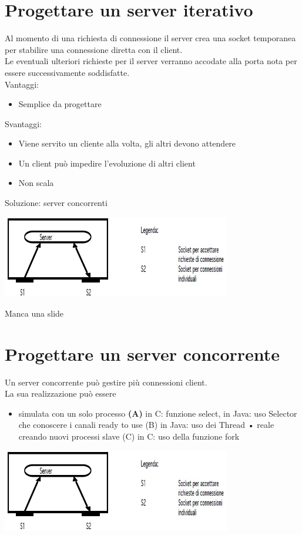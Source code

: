 \section{Progettare un server iterativo}
Al momento di una richiesta di connessione il server crea una socket temporanea per stabilire una connessione diretta con il client.
\\Le eventuali ulteriori richieste per il server verranno accodate alla porta nota per essere successivamente soddisfatte.
\\Vantaggi:
\begin{itemize}
    \item Semplice da progettare
\end{itemize}
Svantaggi:
\begin{itemize}
    \item Viene servito un cliente alla volta, gli altri devono attendere
    \item Un client può impedire l'evoluzione di altri client
    \item Non scala
\end{itemize}
Soluzione: server concorrenti
\begin{center}
    \includegraphics[width=0.75\textwidth]{img/serverIterativi1.jpg}
\end{center}

Manca una slide

\section{Progettare un server concorrente}
Un server concorrente può gestire più connessioni client.
\\La sua realizzazione può essere
\begin{itemize}
    \item simulata con un solo processo \textbf{(A)} in C: funzione select, in Java: uso Selector
che conoscere i canali ready to use
(B) in Java: uso dei Thread
• reale creando nuovi processi slave
(C) in C: uso della funzione fork
\end{itemize}


\begin{center}
    \includegraphics[width=0.75\textwidth]{img/serverIterativi1.jpg}
\end{center}

